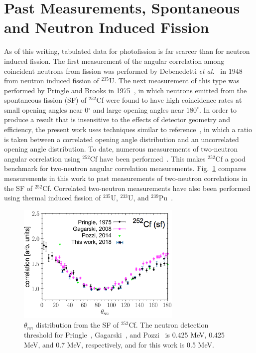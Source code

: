 \section{Past Measurements, Spontaneous and Neutron Induced Fission}
As of this writing, tabulated data for photofission is far scarcer than for neutron induced fission.
The first measurement of the angular correlation among coincident neutrons from fission was performed by Debenedetti \emph{et al.}~\cite{1948twoNCorr} in 1948 from neutron induced fission of $^{235}\text{U}$.
The next measurement of this type was performed by Pringle and Brooks in 1975~\cite{1975Cf252}, in which neutrons emitted from the spontaneous fission (SF) of $^{252}$Cf were found to have high coincidence rates at small opening angles near 0$^{\circ}$ and large opening angles near $180^{\circ}$.
In order to produce a result that is insensitive to the effects of detector geometry and efficiency, the present work uses techniques similar to reference~\cite{1975Cf252}, in which a ratio is taken between a correlated opening angle distribution and an uncorrelated opening angle distribution.
To date, numerous measurements of two-neutron angular correlation using $^{252}$Cf have been performed~\cite{Pozzi2014, 2008CF252, 1975Cf252}.
This makes $^{252}$Cf a good benchmark for two-neutron angular correlation measurements.
Fig.~\ref{fig:Cf252_us_vs_them} compares measurements in this work to past measurements of two-neutron correlations in the SF of $^{252}$Cf.
Correlated two-neutron measurements have also been performed using thermal induced fission of $^{235}$U, $^{233}$U, and $^{239}$Pu~\cite{Sokolov2010}.
\begin{figure}[h]
\includegraphics[width=0.7\textwidth]{Content/Introduction/Cf252_us_vs_them.png}
\caption{$\theta_{nn}$ distribution from the SF of $^{252}$Cf.
 The neutron detection threshold for Pringle~\cite{1975Cf252}, Gagarski~\cite{2008CF252}, and Pozzi~\cite{Pozzi2016} is 0.425 MeV, 0.425 MeV, and 0.7 MeV, respectively, and for this work is 0.5 MeV.
}
\label{fig:Cf252_us_vs_them}
\end{figure}
